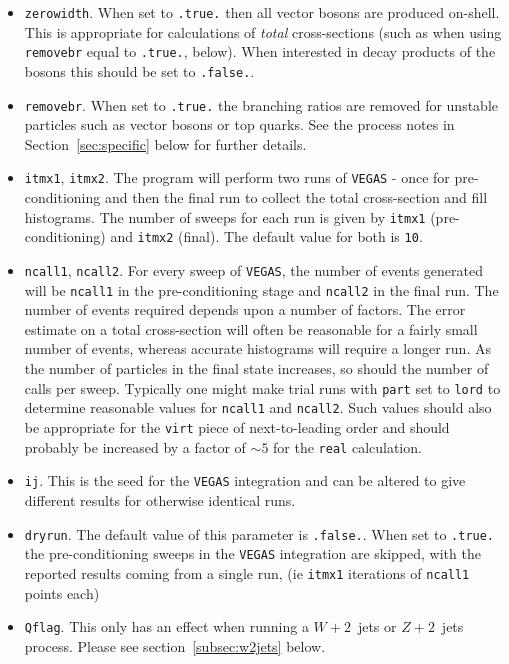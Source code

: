 \documentclass[12pt]{article}
\begin{document}
\begin{itemize}
\item {\tt zerowidth}. When set to {\tt .true.} then all vector
bosons are produced on-shell. This is appropriate for calculations
of {\it total} cross-sections (such as when using {\tt removebr} equal
to {\tt .true.}, below). When interested in decay products of the
bosons this should be set to {\tt .false.}.

\item {\tt removebr}. When set to {\tt .true.} the branching ratios are 
removed for unstable particles such as vector bosons or top quarks. See the
process notes in Section~\ref{sec:specific} below for further details.

\item {\tt itmx1}, {\tt itmx2}. The program will perform two runs of
{\tt VEGAS} - once for pre-conditioning and then the final run to
collect the total cross-section and fill histograms. The number of
sweeps for each run is given by {\tt itmx1} (pre-conditioning)
and {\tt itmx2} (final). The default value for both is {\tt 10}.


\item {\tt ncall1}, {\tt ncall2}. For every sweep of {\tt VEGAS},
the number of events generated will be {\tt ncall1} in the
pre-conditioning stage and {\tt ncall2} in the final run. The number
of events required depends upon a number of factors. The error
estimate on a total cross-section will often be reasonable for a
fairly small number of events, whereas accurate histograms will
require a longer run. As the number of particles in the final state
increases, so should the number of calls per sweep. Typically one
might make trial runs with {\tt part} set to {\tt lord} to determine
reasonable values for {\tt ncall1} and {\tt ncall2}. Such values
should also be appropriate for the {\tt virt} piece of
next-to-leading order and should probably be increased by a factor of
$\sim 5$ for the {\tt real} calculation.

\item {\tt ij}. This is the seed for the {\tt VEGAS} integration
and can be altered to give different results for otherwise identical
runs.

\item {\tt dryrun}. The default value of this parameter is
{\tt .false.}. When set to {\tt .true.} the pre-conditioning sweeps
in the {\tt VEGAS} integration are skipped, with the reported
results coming from a single run, (ie {\tt itmx1} iterations of 
{\tt ncall1} points each)
\item {\tt Qflag}. This only has an effect when running a
$W+2$~jets or $Z+2$~jets process. Please see section~\ref{subsec:w2jets}
below.


\end{itemize}
\end{document}
